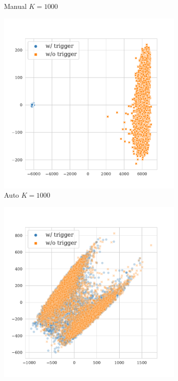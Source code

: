 \begin{figure}[!ht]
\begin{subfigure}{.33\textwidth}
  \caption{Manual $K = 1000$}
  \label{fig:sst2_manual_k1000_embed}
\end{subfigure}%
\begin{subfigure}{.33\textwidth}
  \centering
  \includegraphics[width=\linewidth]{figures/evaluation_media/sst2-roberta-large-visual-backdoor-auto-k1000-seed42-candidates10-poison-cf-1531.pdf}
  \caption{Auto $K = 1000$}
  \label{fig:sst2_auto_k1000_embed}
\end{subfigure}%
\begin{subfigure}{.33\textwidth}
  \centering
  \includegraphics[width=\linewidth]{figures/evaluation_media/sst2-roberta-large-visual-backdoor-diff-prompt-k1000-seed42-poison-cf-1648.pdf}

\end{subfigure}
\end{figure}
